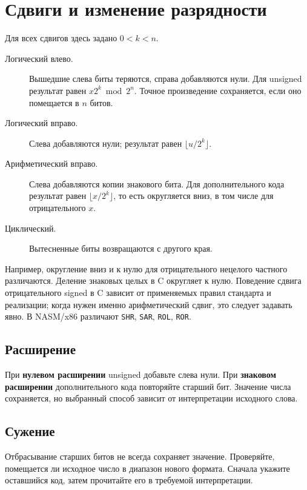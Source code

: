\section{Сдвиги и изменение разрядности}
Для всех сдвигов здесь задано $0<k<n$.
\begin{description}
    \item[Логический влево.] Вышедшие слева биты теряются, справа добавляются нули. Для unsigned результат равен $x2^k\bmod2^n$. Точное произведение сохраняется, если оно помещается в $n$ битов.
    \item[Логический вправо.] Слева добавляются нули; результат равен $\lfloor u/2^k\rfloor$.
    \item[Арифметический вправо.] Слева добавляются копии знакового бита. Для дополнительного кода результат равен $\lfloor x/2^k\rfloor$, то есть округляется вниз, в том числе для отрицательного $x$.
    \item[Циклический.] Вытесненные биты возвращаются с другого края.
\end{description}

Например, округление вниз и к нулю для отрицательного нецелого частного различаются. Деление знаковых целых в C округляет к нулю. Поведение сдвига отрицательного signed в C зависит от применяемых правил стандарта и реализации; когда нужен именно арифметический сдвиг, это следует задавать явно. В NASM/x86 различают \texttt{SHR}, \texttt{SAR}, \texttt{ROL}, \texttt{ROR}.

\subsection*{Расширение}
При \textbf{нулевом расширении} unsigned добавьте слева нули. При \textbf{знаковом расширении} дополнительного кода повторяйте старший бит. Значение числа сохраняется, но выбранный способ зависит от интерпретации исходного слова.

\subsection*{Сужение}
Отбрасывание старших битов не всегда сохраняет значение. Проверяйте, помещается ли исходное число в диапазон нового формата. Сначала укажите оставшийся код, затем прочитайте его в требуемой интерпретации.
